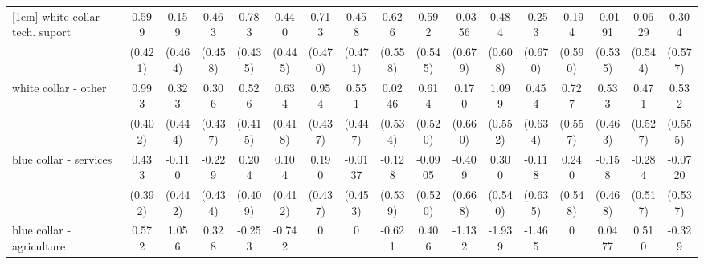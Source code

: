 {\begin{tabular}{l*{16}{c}}
[1em]
white collar - tech. suport&       0.599         &       0.159         &       0.463         &       0.783         &       0.440         &       0.713         &       0.458         &       0.626         &       0.592         &     -0.0356         &       0.484         &      -0.253         &      -0.194         &     -0.0191         &      0.0629         &       0.304         \\
                    &     (0.421)         &     (0.464)         &     (0.458)         &     (0.435)         &     (0.445)         &     (0.470)         &     (0.471)         &     (0.558)         &     (0.545)         &     (0.679)         &     (0.608)         &     (0.670)         &     (0.590)         &     (0.535)         &     (0.544)         &     (0.577)         \\
[1em]
white collar - other&       0.993\sym{*}  &       0.323         &       0.306         &       0.526         &       0.634         &       0.954\sym{*}  &       0.551         &      0.0246         &       0.614         &       0.170         &       1.099\sym{*}  &       0.454         &       0.727         &       0.533         &       0.471         &       0.532         \\
                    &     (0.402)         &     (0.444)         &     (0.437)         &     (0.415)         &     (0.418)         &     (0.437)         &     (0.447)         &     (0.534)         &     (0.520)         &     (0.660)         &     (0.552)         &     (0.634)         &     (0.557)         &     (0.463)         &     (0.527)         &     (0.555)         \\
[1em]
blue collar - services&       0.433         &      -0.110         &      -0.229         &       0.204         &       0.104         &       0.190         &     -0.0137         &      -0.128         &     -0.0905         &      -0.409         &       0.300         &      -0.118         &       0.240         &      -0.158         &      -0.284         &     -0.0720         \\
                    &     (0.392)         &     (0.442)         &     (0.434)         &     (0.409)         &     (0.412)         &     (0.437)         &     (0.453)         &     (0.539)         &     (0.520)         &     (0.668)         &     (0.540)         &     (0.635)         &     (0.548)         &     (0.468)         &     (0.517)         &     (0.537)         \\
[1em]
blue collar - agriculture&       0.572         &       1.056         &       0.328         &      -0.253         &      -0.742         &           0         &           0         &      -0.621         &       0.406         &      -1.132         &      -1.939         &      -1.465         &           0         &      0.0477         &       0.510         &      -0.329         \\

\end{tabular}}
